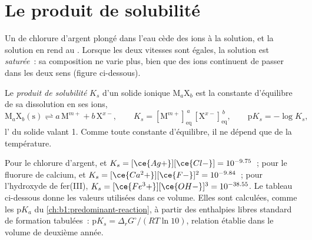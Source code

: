 \section{Le produit de solubilité}\label{sec:b1:precipitation:product}

Un  de chlorure d'argent plongé dans l'eau cède des ions à la
solution, et la solution en rend au . Lorsque les deux vitesses
sont égales, la solution est \emph{saturée}~: sa composition ne varie
plus, bien que des ions continuent de passer dans les deux sens (figure
ci-dessous).

\begin{definition}\label{def:b1:precipitation:solubility-product}
Le \emph{produit de solubilité} $K_s$ d'un solide
ionique $\mathrm{M}_a\mathrm{X}_b$ est la constante d'équilibre de sa
dissolution en ses ions,
\[
  \mathrm{M}_a\mathrm{X}_b\mathrm{(s)} \rightleftharpoons a\,\mathrm{M}^{m+}
  + b\,\mathrm{X}^{x-}, \qquad
  K_s = [\mathrm{M}^{m+}]_{\mathrm{eq}}^{\,a}\,[\mathrm{X}^{x-}]_{\mathrm{eq}}^{\,b},
  \qquad \mathrm{p}K_s = -\log K_s ,
\]
l' du solide valant 1. Comme toute constante d'équilibre, il ne
dépend que de la température.
\end{definition}

Pour le chlorure d'argent,  et $K_s =
[\ce{Ag+}][\ce{Cl-}] = 10^{-9.75}$~; pour le fluorure de calcium,
 et $K_s = [\ce{Ca^2+}][\ce{F-}]^2 = 10^{-9.84}$~; pour
l'hydroxyde de fer(III), $K_s = [\ce{Fe^3+}][\ce{OH-}]^3 = 10^{-38.55}$.
Le tableau ci-dessous donne les valeurs utilisées dans ce volume. Elles
sont calculées, comme les $\mathrm{p}K_a$ du
\cref{ch:b1:predominant-reaction}, à partir des enthalpies libres
standard de formation tabulées~: $\mathrm{p}K_s = \Delta_r G^\circ/(RT\ln 10)$,
relation établie dans le volume de deuxième année.

